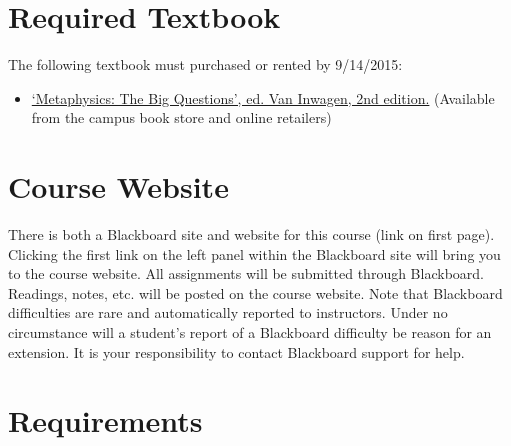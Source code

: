 \documentclass[article,oneside]{memoir}
\begin{document}
\section{Required Textbook}

The following textbook must purchased or rented by 9/14/2015:

\begin{itemize}
\item
\href{http://www.amazon.com/Metaphysics-Questions-Peter-van-Inwagen/dp/1405125861/ref=sr_1_1?ie=UTF8&qid=1440685163&sr=8-1&keywords=metaphysics+big+questions}{`Metaphysics: The Big Questions', ed. Van Inwagen, 2nd edition.} (Available from the campus book store and online retailers)
\end{itemize}

\section{Course Website}
There is both a Blackboard site and website for this course (link on first page). Clicking the first link on the left panel within the Blackboard site will bring you to the course website. All assignments will be submitted through Blackboard. Readings, notes, etc. will be posted on the course website. Note that Blackboard difficulties are rare and automatically reported to instructors. Under no circumstance will a student's report of a Blackboard difficulty be reason for an extension. It is your responsibility to contact Blackboard support for help.


\section{Requirements}
\end{document}
